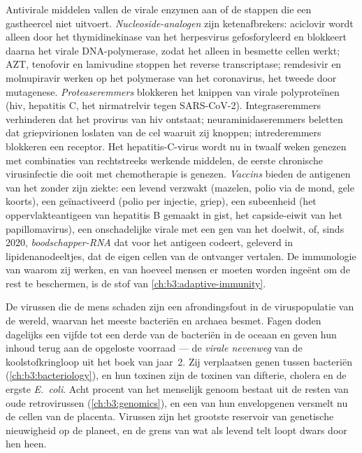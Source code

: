 \begin{definition}\label{def:b3:virology:drugs}
Antivirale middelen vallen de virale enzymen aan of de stappen die een
gastheercel niet uitvoert. \emph{Nucleoside-analogen} zijn
ketenafbrekers: aciclovir wordt alleen door het thymidinekinase van het
herpesvirus gefosforyleerd en blokkeert daarna het virale
DNA-polymerase, zodat het alleen in besmette cellen werkt; AZT,
tenofovir en lamivudine stoppen het reverse transcriptase; remdesivir en
molnupiravir werken op het polymerase van het coronavirus, het tweede
door mutagenese. \emph{Proteaseremmers} blokkeren het knippen van
virale polyproteïnen (hiv, hepatitis C, het nirmatrelvir tegen
SARS-CoV-2). Integraseremmers verhinderen dat het provirus van hiv
ontstaat; neuraminidaseremmers beletten dat griepvirionen loslaten van
de cel waaruit zij knoppen; intrederemmers blokkeren een receptor. Het
hepatitis-C-virus wordt nu in twaalf weken genezen met combinaties van
rechtstreeks werkende middelen, de eerste chronische virusinfectie die
ooit met chemotherapie is genezen. \emph{Vaccins} bieden de antigenen
van het  zonder zijn ziekte: een levend verzwakt  (mazelen,
polio via de mond, gele koorts), een geïnactiveerd  (polio per
injectie, griep), een subeenheid (het oppervlakteantigeen van hepatitis
B gemaakt in gist, het capside-eiwit van het papillomavirus), een
onschadelijke virale  met een gen van het doelwit, of, sinds
2020, \emph{boodschapper-RNA} dat voor het antigeen codeert, geleverd
in lipidenanodeeltjes, dat de eigen cellen van de ontvanger vertalen.
De immunologie van waarom zij werken, en van hoeveel mensen er moeten
worden ingeënt om de rest te beschermen, is de stof van
\cref{ch:b3:adaptive-immunity}.
\end{definition}

\begin{remark}\label{rem:b3:virology:economy}
De virussen die de mens schaden zijn een afrondingsfout in de
viruspopulatie van de wereld, waarvan het meeste bacteriën en archaea
besmet. Fagen doden dagelijks een vijfde tot een derde van de bacteriën
in de oceaan en geven hun inhoud terug aan de opgeloste voorraad --- de
\emph{virale nevenweg} van de koolstofkringloop uit het boek van
jaar~2. Zij verplaatsen genen tussen bacteriën
(\cref{ch:b3:bacteriology}), en hun toxinen zijn de toxinen van
difterie, cholera en de ergste \emph{E.~coli}. Acht procent van het
menselijk genoom bestaat uit de resten van oude retrovirussen
(\cref{ch:b3:genomics}), en een van hun envelopgenen versmelt nu de
cellen van de placenta. Virussen zijn het grootste reservoir van
genetische nieuwigheid op de planeet, en de grens van wat als levend
telt loopt dwars door hen heen.
\end{remark}

